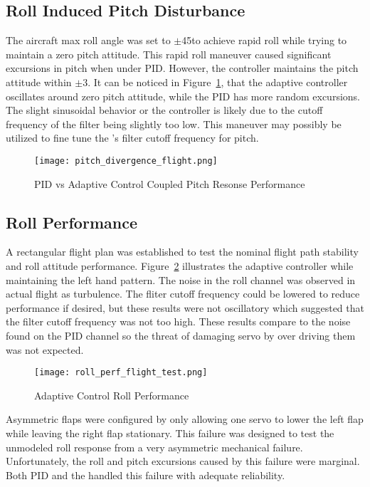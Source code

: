 \subsection{Roll Induced Pitch Disturbance}
The aircraft max roll angle was set to $\pm$45\degrees to achieve rapid roll while trying to maintain a zero pitch attitude.  This rapid roll maneuver caused significant excursions in pitch when under \ac{PID}.  However, the \Lone controller maintains the pitch attitude within $\pm$3\degrees.  It can be noticed in Figure~\ref{fig:pitch_divergence_flight}, that the adaptive controller oscillates around zero pitch attitude, while the \ac{PID} has more random excursions.  The slight sinusoidal behavior or the \Lone controller is likely due to the cutoff frequency of the filter being slightly too low.  This maneuver may possibly be utilized to fine tune the \Lone's filter cutoff frequency for pitch.
\begin{figure}[h!]
 \centering
  \texttt{[image: pitch\_divergence\_flight.png]}
  \caption{PID vs \Lone Adaptive Control Coupled Pitch Resonse Performance}
  \label{fig:pitch_divergence_flight}
\end{figure}

\subsection{Roll Performance}
A rectangular flight plan was established to test the nominal flight path stability and roll attitude performance.  Figure~\ref{fig:roll_perf_flight_test} illustrates the \Lone adaptive controller while maintaining the left hand pattern.  The noise in the roll channel was observed in actual flight as turbulence.  The fliter cutoff frequency could be lowered to reduce performance if desired, but these results were not oscillatory which suggested that the filter cutoff frequency was not too high.  These results compare to the noise found on the \ac{PID} channel so the threat of damaging servo by over driving them was not expected.
\begin{figure}[h!]
 \centering
  \texttt{[image: roll\_perf\_flight\_test.png]}
  \caption{\Lone Adaptive Control Roll Performance}
  \label{fig:roll_perf_flight_test}
\end{figure}

Asymmetric flaps were configured by only allowing one servo to lower the left flap while leaving the right flap stationary.  This failure was designed to test the unmodeled roll response from a very asymmetric mechanical failure.  Unfortunately, the roll and pitch excursions caused by this failure were marginal.  Both \ac{PID} and the \Lone handled this failure with adequate reliability. 


